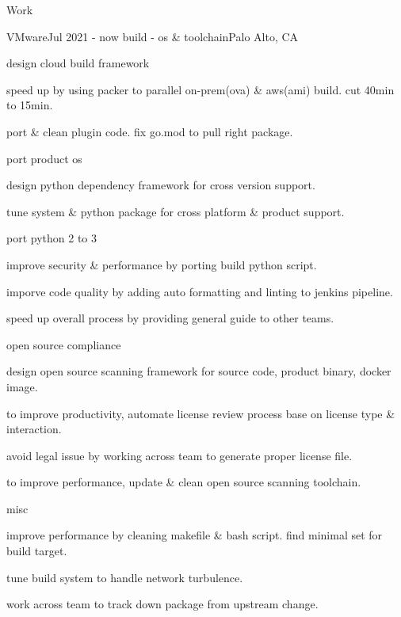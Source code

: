 \documentclass{cv}
\begin{document}
	\begin{rSection}
		{Work}
		\begin{rSubsection}
			{VMware}{Jul 2021 - now} {build - os \& toolchain}{Palo Alto, CA}
			\begin{project}
				{design cloud build framework} \item speed up by using packer to parallel
				on-prem(ova) \& aws(ami) build. cut 40min to 15min. \item port \& clean plugin
				code. fix go.mod to pull right package.
			\end{project}

			\begin{project}
				{port product os} \item design python dependency framework for cross version
				support. \item tune system \& python package for cross platform \&
				product support.
			\end{project}

			\begin{project}
				{port python 2 to 3} \item improve security \& performance by porting build
				python script. \item imporve code quality by adding auto formatting and
				linting to jenkins pipeline. \item speed up overall process by providing general
				guide to other teams.
			\end{project}

			\begin{project}
				{open source compliance} \item design open source scanning framework for
				source code, product binary, docker image. \item to improve productivity,
				automate license review process base on license type \& interaction.
				\item avoid legal issue by working across team to generate proper
				license file. \item to improve performance, update \& clean open source
				scanning toolchain.
			\end{project}

			\begin{project}
				{misc} \item improve performance by cleaning makefile \& bash script.
				find minimal set for build target. \item tune build system to handle network
				turbulence. \item work across team to track down package from upstream
				change.
			\end{project}
		\end{rSubsection}
	\end{rSection}
\end{document}
